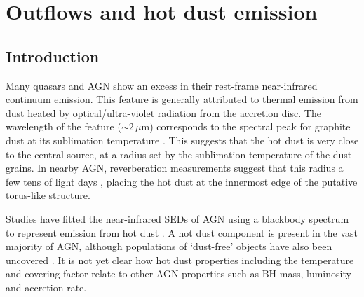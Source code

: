 
\chapter{Outflows and hot dust emission}
\label{ch:sed} 



\section{Introduction}

Many quasars and AGN show an excess in their rest-frame near-infrared continuum emission. 
This feature is generally attributed to thermal emission from dust heated by optical/ultra-violet radiation from the accretion disc. 
The wavelength of the feature ($\sim2$\,$\mu$m) corresponds to the spectral peak for graphite dust at its sublimation temperature \citep[$T\sim1500$\,K;][]{barvainis87}. 
This suggests that the hot dust is very close to the central source, at a radius set by the sublimation temperature of the dust grains.
In nearby AGN, reverberation measurements suggest that this radius a few tens of light days \citep[e.g.][]{minezaki04,suganuma06}, placing the hot dust at the innermost edge of the putative torus-like structure.   

Studies have fitted the near-infrared SEDs of AGN using a blackbody spectrum to represent emission from hot dust \citep[e.g.][]{edelson86,barvainis87,kishimoto07,mor09,riffel09,deo11,landt11,mor11,roseboom13}. 
A hot dust component is present in the vast majority of AGN, although populations of `dust-free' objects have also been uncovered \citep{hao10,hao11,jiang10,mor11}. 
It is not yet clear how hot dust properties including the temperature and covering factor relate to other AGN properties such as BH mass, luminosity and accretion rate. 

